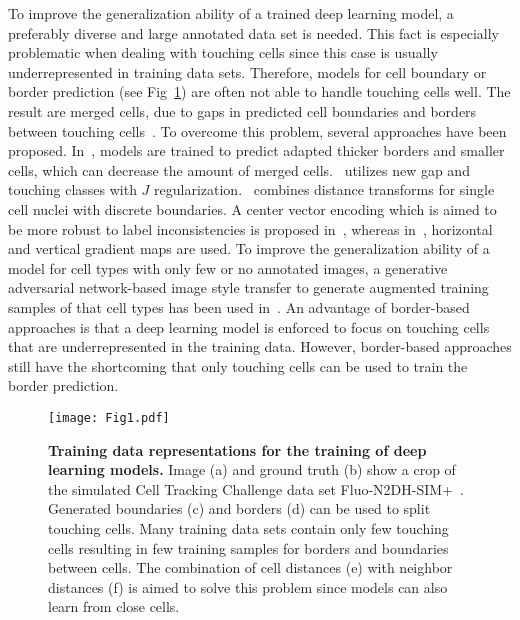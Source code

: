 \documentclass[10pt,letterpaper]{article}
\begin{document}
To improve the generalization ability of a trained deep learning model, a preferably diverse and large annotated data set is needed. This fact is especially problematic when dealing with touching cells since this case is usually underrepresented in training data sets. Therefore, models for cell boundary or border prediction (see Fig~\ref{fig:trainingDataRepresentations}) are often not able to handle touching cells well. The result are merged cells, due to gaps in predicted cell boundaries and borders between touching cells~\cite{Scherr2018, Pena2019}. To overcome this problem, several approaches have been proposed. In~\cite{Scherr2018}, models are trained to predict adapted thicker borders and smaller cells, which can decrease the amount of merged cells. \cite{Pena2019}~utilizes new gap and touching classes with $J$ regularization. \cite{Li2019}~combines distance transforms for single cell nuclei with discrete boundaries. A center vector encoding which is aimed to be more robust to label inconsistencies is proposed in~\cite{Li2019b}, whereas in~\cite{Graham2019}, horizontal and vertical gradient maps are used. To improve the generalization ability of a model for cell types with only few or no annotated images, a generative adversarial network-based image style transfer to generate augmented training samples of that cell types has been used in~\cite{Hollandi2019}. An advantage of border-based approaches is that a deep learning model is enforced to focus on touching cells that are underrepresented in the training data. However, border-based approaches still have the shortcoming that only touching cells can be used to train the border prediction.
\begin{figure}
\begin{adjustwidth}{-2.25in}{0in}
\centering
\texttt{[image: Fig1.pdf]}
\caption{\textbf{Training data representations for the training of deep learning models.} Image (a) and ground truth (b) show a crop of the simulated Cell Tracking Challenge data set Fluo-N2DH-SIM+~\cite{Ulman2017, Maska2014}. Generated boundaries (c) and borders (d) can be used to split touching cells. Many training data sets contain only few touching cells resulting in few training samples for borders and boundaries between cells. The combination of cell distances (e) with neighbor distances (f) is aimed to solve this problem since models can also learn from close cells.}
\label{fig:trainingDataRepresentations}
\end{adjustwidth}
\end{figure}
\end{document}

